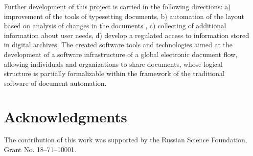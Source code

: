 \documentclass[conference,a4paper]{IEEEtran}
\providecommand\url[1]{\texttt{#1}}
\begin{document}
Further development of this project is carried in the following directions: a) improvement of the tools of typesetting documents, b) automation of the layout based on analysis of changes in the documents \cite{b2}, c) collecting of additional information about user needs, d) develop a regulated access to information stored in digital archives.  The created software tools and technologies aimed at the development of a software infrastructure of a global electronic document flow, allowing individuals and organizations to share documents, whose logical structure is partially formalizable within the framework of the traditional software of document automation.

\section{Acknowledgments}
The contribution of this work was supported by the Russian Science Foundation, Grant No. 18--71--10001.

\end{document}

